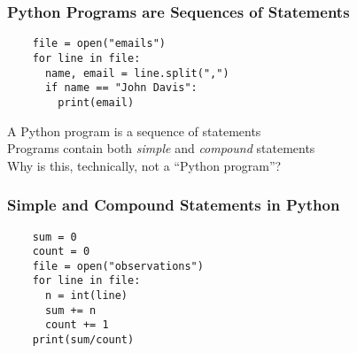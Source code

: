 \documentclass[14pt,aspectratio=169]{beamer}
\begin{document}
%
\begin{frame}[fragile]
  \frametitle{Python Programs are Sequences of Statements}
  \normalsize
  \hspace*{-.65in}
  \begin{minipage}{6in}
    \vspace*{.25in}
    \begin{verbatim}
    file = open("emails")
    for line in file:
      name, email = line.split(",")
      if name == "John Davis":
        print(email)
    \end{verbatim}
  \end{minipage}
  \vspace*{.25in}
  \begin{center}
    \normalsize \noindent A Python program is a sequence of statements \\
    \normalsize \noindent Programs contain both {\em simple} and {\em compound} statements \\
    \normalsize \noindent Why is this, technically, not a ``Python program''? \\
  \end{center}
\end{frame}

%
\begin{frame}[fragile]
  \frametitle{Simple and Compound Statements in Python}
  \hspace*{-.6in}
  \begin{minipage}{6in}
    \begin{verbatim}
    sum = 0
    count = 0
    file = open("observations")
    for line in file:
      n = int(line)
      sum += n
      count += 1
    print(sum/count)
    \end{verbatim}
  \end{minipage}
\end{frame}
\end{document}
